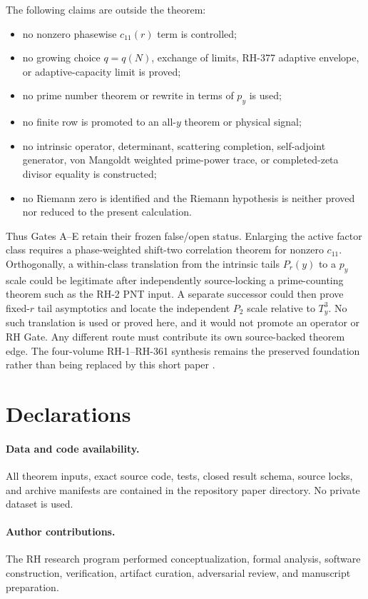 \documentclass[11pt]{article}
\theoremstyle{definition}
\theoremstyle{remark}
\begin{document}
The following claims are outside the theorem:
\begin{itemize}[leftmargin=2em]
 \item no nonzero phasewise $c_{11}(r)$ term is controlled;
 \item no growing choice $q=q(N)$, exchange of limits, RH-377 adaptive
       envelope, or adaptive-capacity limit is proved;
 \item no prime number theorem or rewrite in terms of $p_y$ is used;
 \item no finite row is promoted to an all-$y$ theorem or physical signal;
 \item no intrinsic operator, determinant, scattering completion,
       self-adjoint generator, von Mangoldt weighted prime-power trace, or
       completed-zeta divisor equality is constructed;
 \item no Riemann zero is identified and the Riemann hypothesis is neither
       proved nor reduced to the present calculation.
\end{itemize}
Thus Gates A--E retain their frozen false/open status.  Enlarging the active
factor class requires a phase-weighted shift-two correlation theorem for
nonzero $c_{11}$.  Orthogonally, a within-class translation from the intrinsic
tails $P_r(y)$ to a $p_y$ scale could be legitimate after independently
source-locking a prime-counting theorem such as the RH-2 PNT input.  A
separate successor could then prove fixed-$r$ tail asymptotics and locate the
independent $P_2$ scale relative to $T_y^3$.  No such translation is used or
proved here, and it would not promote an operator or RH Gate.  Any different
route must contribute its own source-backed theorem edge.  The four-volume RH-1--RH-361 synthesis remains
the preserved foundation rather than being replaced by this short paper
\cite{RHMVP2}.

\section*{Declarations}

\paragraph{Data and code availability.}
All theorem inputs, exact source code, tests, closed result schema, source
locks, and archive manifests are contained in the repository paper
directory.  No private dataset is used.

\paragraph{Author contributions.}
The RH research program performed conceptualization, formal analysis,
software construction, verification, artifact curation, adversarial review,
and manuscript preparation.
\end{document}
